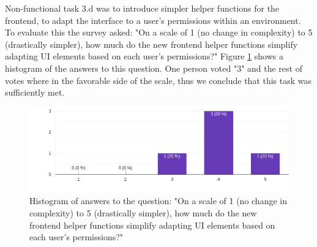 
Non-functional task 3.d was to introduce simpler helper functions for the frontend, to adapt
the interface to a user's permissions within an environment. To evaluate this the survey asked: 
"On a scale of 1 (no change in complexity) to 5 (drastically simpler), how much do the new
frontend helper functions simplify adapting UI elements based on each user’s
permissions?"
Figure \ref{fig:evaluation:non-functional:3.4} shows a histogram of the answers to this question.
One person voted "3" and the rest of votes where in the favorable side of the scale,
thus we conclude that this task was sufficiently met.

\begin{figure}[h]
	\centering
  \includegraphics[scale=0.55]{../../figures/survey/3.4-frontend-permissions.png}
	\caption{Histogram of answers to the question: "On a scale of 1 (no change in complexity) to 5 (drastically simpler), how much do the new
frontend helper functions simplify adapting UI elements based on each user’s
permissions?"}
	\label{fig:evaluation:non-functional:3.4}
\end{figure}


